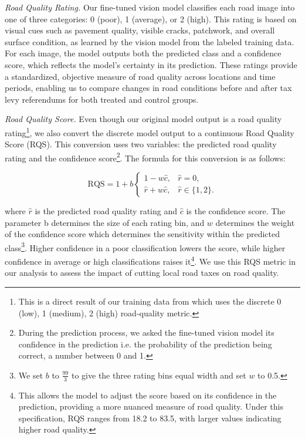 \textit{Road Quality Rating.} Our fine-tuned vision model classifies each road image into one of three categories: 0 (poor), 1 (average), or 2 (high). This rating is based on visual cues such as pavement quality, visible cracks, patchwork, and overall surface condition, as learned by the vision model from the labeled training data. For each image, the model outputs both the predicted class and a confidence score, which reflects the model's certainty in its prediction. These ratings provide a standardized, objective measure of road quality across locations and time periods, enabling us to compare changes in road conditions before and after tax levy referendums for both treated and control groups.

\textit{Road Quality Score.} Even though our original model output is a road quality rating\footnote{This is a direct result of our training data from \cite{brewer2021} which uses the discrete 0 (low), 1 (medium), 2 (high) road-quality metric.}, we also convert the discrete model output to a continuous Road Quality Score (RQS). This conversion uses two variables: the predicted road quality rating and the confidence score\footnote{During the prediction process, we asked the fine-tuned vision model its confidence in the prediction i.e. the probability of the prediction being correct, a number between 0 and 1.}. The formula for this conversion is as follows:

\begin{equation}
\text{RQS} = 1 + b
\begin{cases}
1 - w\hat{c}, & \hat{r}=0,\\
\hat{r} + w\hat{c}, & \hat{r}\in\{1,2\}.
\end{cases}
\label{eq:rqs_formula}
\end{equation}

\noindent
where $\hat{r}$ is the predicted road quality rating and $\hat{c}$ is the confidence score. The parameter b determines the size of each rating bin, and $w$ determines the weight of the confidence score which determines the sensitivity within the predicted class\footnote{We set $b$ to $\frac{99}{3}$ to give the three rating bins equal width and set $w$ to 0.5.}. Higher confidence in a poor classification lowers the score, while higher confidence in average or high classifications raises it\footnote{This allows the model to adjust the score based on its confidence in the prediction, providing a more nuanced measure of road quality. Under this specification, RQS ranges from 18.2 to 83.5, with larger values indicating higher road quality.}. We use this RQS metric in our analysis to assess the impact of cutting local road taxes on road quality.

